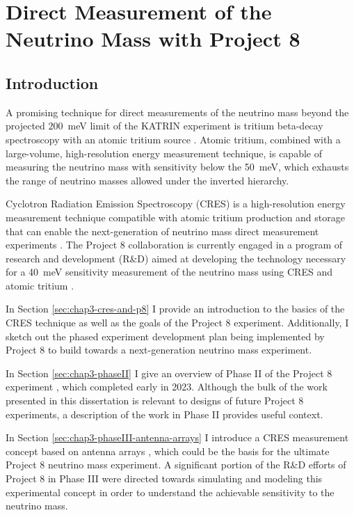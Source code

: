 
\chapter{Direct Measurement of the Neutrino Mass with Project 8}

\section{Introduction}

A promising technique for direct measurements of the neutrino mass beyond the projected $200$~meV limit of the KATRIN experiment \cite{KATRIN:2022kkv} is tritium beta-decay spectroscopy with an atomic tritium source \cite{direct_meas_nu_mass}. Atomic tritium, combined with a large-volume, high-resolution energy measurement technique, is capable of measuring the neutrino mass with sensitivity below the 50~meV, which exhausts the range of neutrino masses allowed under the inverted hierarchy. 

Cyclotron Radiation Emission Spectroscopy (CRES) is a high-resolution energy measurement technique compatible with atomic tritium production and storage that can enable the next-generation of neutrino mass direct measurement experiments \cite{p8originalcres}. The Project 8 collaboration is currently engaged in a program of research and development (R\&D) aimed at developing the technology necessary for a 40~meV sensitivity measurement of the neutrino mass using CRES and atomic tritium \cite{p8snowmass2022}.

In Section \ref{sec:chap3-cres-and-p8} I provide an introduction to the basics of the CRES technique as well as the goals of the Project 8 experiment. Additionally, I sketch out the phased experiment development plan being implemented by Project 8 to build towards a next-generation neutrino mass experiment.

In Section \ref{sec:chap3-phaseII} I give an overview of Phase II of the Project 8 experiment \cite{p8prc2023,p8prl2023}, which completed early in 2023. Although the bulk of the work presented in this dissertation is relevant to designs of future Project 8 experiments, a description of the work in Phase II provides useful context.

In Section \ref{sec:chap3-phaseIII-antenna-arrays} I introduce a CRES measurement concept based on antenna arrays \cite{p8jugaad}, which could be the basis for the ultimate Project 8 neutrino mass experiment. A significant portion of the R\&D efforts of Project 8 in Phase III were directed towards simulating and modeling this experimental concept in order to understand the achievable sensitivity to the neutrino mass.

